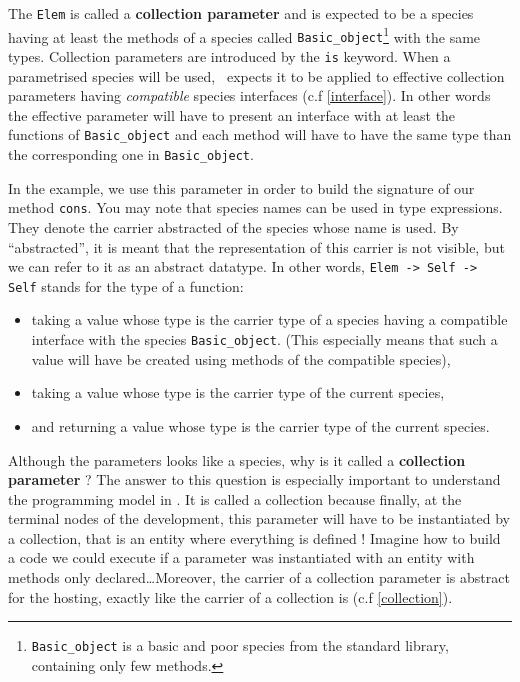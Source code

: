 The {\tt Elem} is called a {\bf collection parameter} and is expected
to be a species having at least the methods of a species called
{\tt Basic\_object}\footnote{{\tt Basic\_object} is a basic and poor
species from the standard library, containing only few methods.} with
the same types. Collection parameters are introduced by the {\tt is}
keyword. When a parametrised species will be used, \focal\ expects it
to be applied to effective collection parameters having
{\em compatible}
species interfaces (c.f \ref{interface}). In other words the effective
parameter will have to present an interface with at least the
functions of {\tt Basic\_object} and each method will have to have the
same type than the corresponding one in {\tt Basic\_object}.

\smallskip
In the example, we use this parameter in order to build the signature
of our method {\tt cons}. You may note that species names can be used
in type expressions. They denote the carrier abstracted of the species
whose name is used. By ``abstracted'', it is meant that the
representation of this carrier is not visible, but we can refer to it
as an abstract datatype. In other words, {\tt Elem -> Self -> Self}
stands for the type of a function:
\begin{itemize}
  \item taking a value whose type is the carrier type of a species
    having a compatible interface with the species
    {\tt Basic\_object}. (This especially means that such a value will
    have be created using methods of the compatible species),
  \item taking a value whose type is the carrier type of the current
    species,
  \item and returning a value whose type is the carrier type of the
    current species.
\end{itemize}

\smallskip
Although the parameters looks like a species, why is it called a
{\bf collection parameter} ? The answer to this question is especially
important to understand the programming model in \focal. It is called
a collection because finally, at the terminal nodes of the
development, this parameter will have to be instantiated by a
collection, that is an entity where everything is defined ! Imagine
how to build a code we could execute if a parameter was instantiated
with an entity with methods only declared\ldots Moreover, the carrier
of a collection parameter is abstract for the hosting, exactly like
the carrier of a collection is (c.f \ref{collection}).

